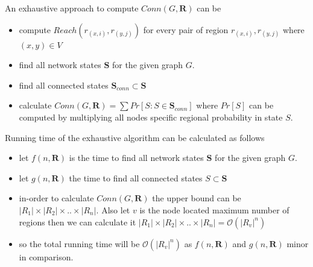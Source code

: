 \documentclass[11pt]{article}
\begin{document}
An exhaustive approach to compute $Conn(G,\textbf{R})$ can be 
\begin{itemize}[noitemsep,nolistsep]
\item compute $Reach(r_{(x,i)},r_{(y,j)})$ for every pair of region $r_{(x,i)}, r_{(y,j)}$ where $(x,y)\in V$
\item find all network states $\textbf{S}$ for the given graph $G$.
\item find all connected states $\textbf{S}_{conn}\subset\textbf{S}$ 
\item calculate $Conn(G,\textbf{R})= \sum Pr[S:S\in \textbf{S}_{conn}]$ where $Pr[S]$ can be computed by multiplying all nodes specific regional probability in state $S$.
\end{itemize}
Running time of the exhaustive algorithm can be calculated as follows
\begin{itemize}[noitemsep,nolistsep]
\item let $f(n,\textbf{R})$ is the time to find all network states $\textbf{S}$ for the given graph $G$.
\item let $g(n,\textbf{R})$ the time to find all connected states $S\subset\textbf{S}$
\item in-order to calculate $Conn(G,\textbf{R})$ the upper bound can be $|R_1|\times|R_2|\times..\times|R_n|$. Also let $v$ is the node located maximum number of regions then we can calculate it $|R_1|\times|R_2|\times..\times|R_n|=\mathcal{O}(|R_v|^n)$
\item so the total running time will be $\mathcal{O}(|R_v|^n)$ as $f(n,\textbf{R})$ and $g(n,\textbf{R})$ minor in comparison.
\end{itemize}

\end{document}
